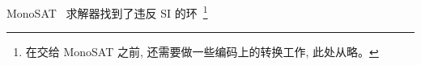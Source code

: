 

\begin{frame}{}
	\begin{center}

		\vspace{0.20cm}
		MonoSAT~ 求解器找到了违反 SI 的环~\footnote{
			在交给 MonoSAT 之前, 还需要做一些编码上的转换工作, 此处从略。
		}
	\end{center}
\end{frame}

\begin{frame}{}
	\begin{center}
	\end{center}
\end{frame}

\begin{frame}{}
	\begin{center}
		{}
	\end{center}
\end{frame}

